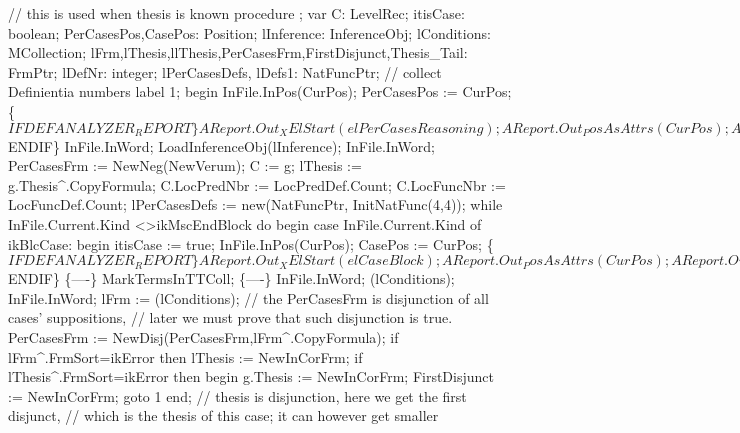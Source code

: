 \nwenddocs{}\endmoddef\nwstartdeflinemarkup{}\nwenddeflinemarkup
// this is used when thesis is known
procedure ;
var
   C: LevelRec;
   itisCase: boolean;
   PerCasesPos,CasePos: Position;
   lInference: InferenceObj;
   lConditions: MCollection;
   lFrm,lThesis,llThesis,PerCasesFrm,FirstDisjunct,Thesis_Tail: FrmPtr;
   lDefNr: integer;
   lPerCasesDefs, lDefs1: NatFuncPtr; // collect Definientia numbers
label 1;
begin
   InFile.InPos(CurPos);
   PerCasesPos := CurPos;
   \{$IFDEF ANALYZER_REPORT\}
   AReport.Out_XElStart(elPerCasesReasoning);
   AReport.Out_PosAsAttrs(CurPos);
   AReport.Out_XAttrEnd;
   AReport.Out_XElStart0(elBlockThesis);
   AReport.Out_Formula(g.Thesis);
   AReport.Out_XElEnd(elBlockThesis);
   \{$ENDIF\}
   InFile.InWord;
   LoadInferenceObj(lInference);
   InFile.InWord;
   PerCasesFrm := NewNeg(NewVerum);
   C := g; lThesis := g.Thesis^.CopyFormula;
   C.LocPredNbr := LocPredDef.Count;
   C.LocFuncNbr := LocFuncDef.Count;
   lPerCasesDefs         := new(NatFuncPtr, InitNatFunc(4,4));
   while InFile.Current.Kind <>ikMscEndBlock do
   begin
      case InFile.Current.Kind of
         ikBlcCase:
            begin
               itisCase := true;
               InFile.InPos(CurPos); CasePos := CurPos;
               \{$IFDEF ANALYZER_REPORT\}
               AReport.Out_XElStart(elCaseBlock);
               AReport.Out_PosAsAttrs(CurPos);
               AReport.Out_XAttrEnd;
               \{$ENDIF\}
               \{----\}
               MarkTermsInTTColl;
               \{----\}
               InFile.InWord;
               (lConditions);
               InFile.InWord;
               lFrm := (lConditions);
               // the PerCasesFrm is disjunction of all cases' suppositions,
               // later we must prove that such disjunction is true.
               PerCasesFrm := NewDisj(PerCasesFrm,lFrm^.CopyFormula);
               if lFrm^.FrmSort=ikError then lThesis := NewInCorFrm;
               if lThesis^.FrmSort=ikError then
               begin g.Thesis := NewInCorFrm; FirstDisjunct := NewInCorFrm; goto 1 end;
               // thesis is disjunction, here we get the first disjunct,
               // which is the thesis of this case; it can however get smaller
